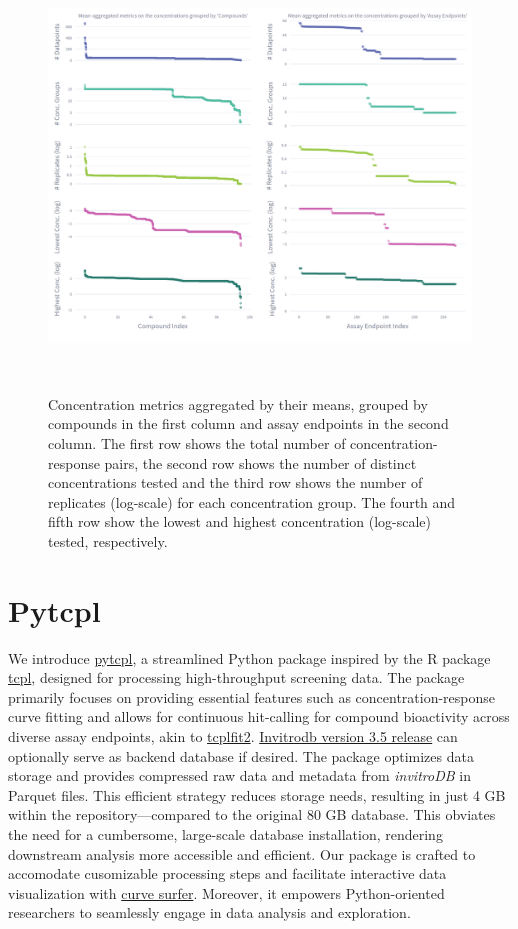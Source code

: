 \begin{figure}[htbp]  %
    \centering
    \includegraphics[width=1.0\textwidth]{figures/concentration_metrics.png}  
    \caption{Concentration metrics aggregated by their means, grouped by compounds in the first column and assay endpoints in the second column. The first row shows the total number of concentration-response pairs, the second row shows the number of distinct concentrations tested and the third row shows the number of replicates (log-scale) for each concentration group. The fourth and fifth row show the lowest and highest concentration (log-scale) tested, respectively.}
~\label{fig:concentration_metrics} 
\end{figure}


\section{Pytcpl}
We introduce \href{https://github.com/rbBosshard/pytcpl}{pytcpl}, a streamlined Python package inspired by the R package \href{https://github.com/USEPA/CompTox-ToxCast-tcpl}{tcpl}, designed for processing high-throughput screening data. The package primarily focuses on providing essential features such as concentration-response curve fitting and allows for continuous hit-calling for compound bioactivity across diverse assay endpoints, akin to \href{https://github.com/USEPA/CompTox-ToxCast-tcplFit2}{tcplfit2}. \href{https://cfpub.epa.gov/si/si_public_record_Report.cfm?dirEntryId=355484&Lab=CCTE}{Invitrodb version 3.5 release} can optionally serve as backend database if desired. The package optimizes data storage and provides compressed raw data and metadata from \emph{invitroDB} in Parquet files. This efficient strategy reduces storage needs, resulting in just 4 GB within the repository—compared to the original 80 GB database. This obviates the need for a cumbersome, large-scale database installation, rendering downstream analysis more accessible and efficient. Our package is crafted to accomodate cusomizable processing steps and facilitate interactive data visualization with \href{https://pytcpl.streamlit.app/}{curve surfer}. Moreover, it empowers Python-oriented researchers to seamlessly engage in data analysis and exploration.

